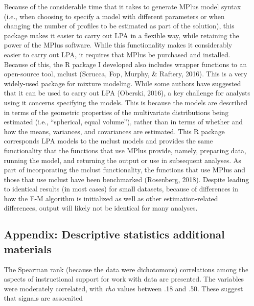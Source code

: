 \documentclass[]{msu-thesis}
\theoremstyle{definition}
\theoremstyle{definition}
\theoremstyle{definition}
\theoremstyle{remark}
\begin{document}
Because of the considerable time that it takes to generate MPlus model
syntax (i.e., when choosing to specify a model with different parameters
or when changing the number of profiles to be estimated as part of the
solution), this package makes it easier to carry out LPA in a flexible
way, while retaining the power of the MPlus software. While this
functionality makes it considerably easier to carry out LPA, it requires
that MPlus be purchased and installed. Because of this, the R package I
developed also includes wrapper functions to an open-source tool, mclust
(Scrucca, Fop, Murphy, \& Raftery, 2016). This is a very widely-used
package for mixture modeling. While some authors have suggested that it
can be used to carry out LPA (Oberski, 2016), a key challenge for
analysts using it concerns specifying the models. This is because the
models are described in terms of the geometric properties of the
multivariate distributions being estimated (i.e., ``spherical, equal
volume''), rather than in terms of whether and how the means, variances,
and covariances are estimated. This R package corresponds LPA models to
the mclust models and provides the same functionality that the functions
that use MPlus provide, namely, preparing data, running the model, and
returning the output or use in subsequent analyses. As part of
incorporating the mclust functionality, the functions that use MPlus and
those that use mclust have been benchmarked (Rosenberg, 2018). Despite
leading to identical results (in most cases) for small datasets, because
of differences in how the E-M algorithm is initialized as well as other
estimation-related differences, output will likely not be identical for
many analyses.

\subsection{Appendix: Descriptive statistics additional
materials}\label{appendix-descriptive-statistics-additional-materials}

The Spearman rank (because the data were dichotomous) correlations among
the aspects of instructional support for work with data are presented.
The variables were moderately correlated, with \emph{rho} values between
.18 and .50. These suggest that signals are assocaited
\end{document}
